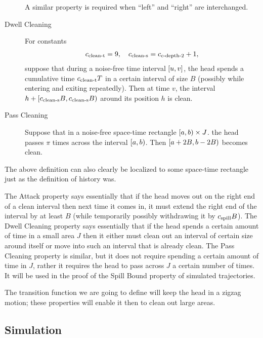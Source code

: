 \documentclass[12pt]{memoir}
\def\B{B}
\newcommand{\Tu}{T}
\newcommand{\cns}[1]{c_{\textrm{\upshape #1}}}
\newcommand{\cCleanS}{\cns{clean-s}}
\newcommand{\cCleanT}{\cns{clean-t}}
\newcommand{\cCDepth}[1]{\cns{c-depth-#1}}
\newcommand{\cSpill}{\cns{spill}}
\begin{document}
\begin{definition}[Trajectory]
\begin{description}
A similar property is required when ``left'' and ``right'' are interchanged.

\item[Dwell Cleaning] \label{i:def.traj.dwell-cleaning}
For constants
\begin{align}\label{eq:cns.clean}
        \cCleanT =9,
\quad   \cCleanS =\cCDepth2 +1,
 \end{align}
suppose that during a noise-free time interval \( [u,v] \), 
the head spends a cumulative time 
 \( \cCleanT \Tu \)  in a certain interval of size \( \B \)
(possibly while entering and exiting repeatedly).
Then at time \( v \), the interval 
\( h+\lint{\cCleanS \B}{\cCleanS\B}  \) around its position \( h \) is clean.

\item[Pass Cleaning]\label{i:def.traj.pass-cleaning}
Suppose that in a noise-free space-time rectangle \( \left[a,b\right)\times J \).
the head passes \( \pi \) times across the interval \( \left[a,b\right) \).
Then \( \lint{a+2\B}{b-2\B} \) %
becomes clean.

\end{description}

\end{definition}

The above definition can also clearly be localized to some space-time
rectangle just as the definition of history was.

The Attack property says essentially that if the head moves out on the right end
of a clean interval then next time it comes in, it must extend the right end of the interval 
by at least \( \B \) (while temporarily possibly withdrawing it by \( \cSpill\B \)).
The Dwell Cleaning property says essentially 
that if the head spends a certain amount of time in a small area \( J \)
then it either must clean out an interval of certain size around itself or move into
such an interval that is already clean.
The Pass Cleaning property is similar, but it does not require spending a certain amount of
time in \( J \), rather it requires the head to pass across \( J \) a certain number of times.
It will be used in the proof of the Spill Bound property of simulated trajectories.

The transition function we are going to define will keep the head in a zigzag motion;
these properties will enable it then to clean out large areas.


\subsection{Simulation}
\end{document}
